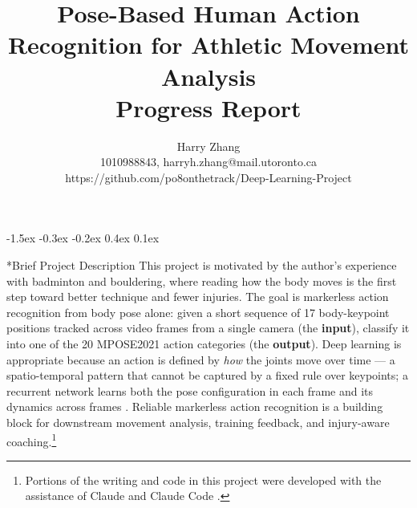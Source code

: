 \documentclass[final]{article}
\title{Pose-Based Human Action Recognition for Athletic Movement Analysis\\\large Progress Report}
\author{%
  Harry Zhang\\
  1010988843, harryh.zhang@mail.utoronto.ca\\
  https://github.com/po8onthetrack/Deep-Learning-Project\\
}
\makeatletter
\renewcommand{\section}{%
  \@startsection{section}{1}{\z@}%
                {-1.5ex \@plus -0.3ex \@minus -0.2ex}%
                {0.4ex \@plus 0.1ex}%
                {\large\bf\raggedright}%
}
\makeatother
\begin{document}
\maketitle
\vspace{-0.45in}

\section*{Brief Project Description}
This project is motivated by the author's experience with badminton and bouldering, where reading how the body moves is the first step toward better technique and fewer injuries. The goal is markerless action recognition from body pose alone: given a short sequence of 17 body-keypoint positions tracked across video frames from a single camera (the \textbf{input}), classify it into one of the 20 MPOSE2021 action categories (the \textbf{output}). Deep learning is appropriate because an action is defined by \emph{how} the joints move over time --- a spatio-temporal pattern that cannot be captured by a fixed rule over keypoints; a recurrent network learns both the pose configuration in each frame and its dynamics across frames \citep{du2015hierarchical}. Reliable markerless action recognition is a building block for downstream movement analysis, training feedback, and injury-aware coaching.\footnote{Portions of the writing and code in this project were developed with the assistance of Claude \citep{anthropic2026claude} and Claude Code \citep{anthropic2026claudecode}.}
\end{document}
